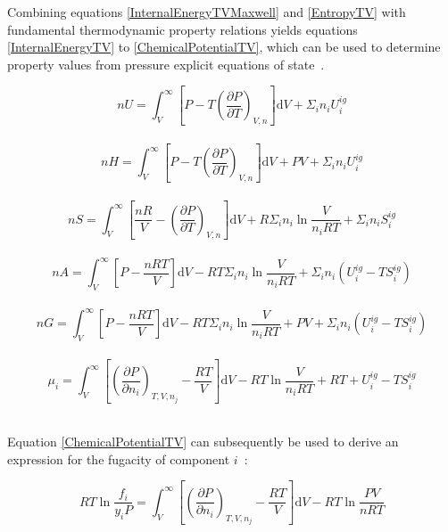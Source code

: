 
Combining equations \ref{InternalEnergyTVMaxwell} and \ref{EntropyTV} with fundamental thermodynamic property relations yields equations \ref{InternalEnergyTV} to \ref{ChemicalPotentialTV}, which can be used to determine property values from pressure explicit equations of state~\cite{MolecularThermodynamicsOfFluidPhaseEquilibria,ThermophysicalProperties}.\

\begin{equation}
nU = \int_{V}^{\infty} \left[ P - T\left(\frac{\partial P }{\partial T}\right)_{V, n} \right]\mathrm{d}V + \Sigma_{i} n_{i}U_{i}^{ig} \label{InternalEnergyTV}
\end{equation}\
\begin{equation}
nH = \int_{V}^{\infty} \left[ P - T\left(\frac{\partial P }{\partial T}\right)_{V, n} \right]\mathrm{d}V + PV +\Sigma_{i} n_{i}U_{i}^{ig}
\end{equation}\
\begin{equation}
nS = \int_{V}^{\infty} \left[ \frac{nR}{V} -\left(\frac{\partial P }{\partial T}\right)_{V, n} \right]\mathrm{d}V + R\Sigma_{i} n_{i} \ln \frac{V}{n_{i}RT}+ \Sigma_{i} n_{i}S_{i}^{ig}
\end{equation}\
\begin{equation}
nA = \int_{V}^{\infty} \left[P -\frac{nRT }{V}\right]\mathrm{d}V - RT\Sigma_{i} n_{i} \ln \frac{V}{n_{i}RT}+ \Sigma_{i} n_{i}\left(U_{i}^{ig} -TS_{i}^{ig}\right) \label{HelmholtzFromEOS}
\end{equation}\
\begin{equation}
nG = \int_{V}^{\infty} \left[P -\frac{nRT }{V}\right]\mathrm{d}V - RT\Sigma_{i} n_{i} \ln \frac{V}{n_{i}RT}+ PV + \Sigma_{i} n_{i}\left(U_{i}^{ig} -TS_{i}^{ig}\right)
\end{equation}\
\begin{equation}
\mu_{i} = \int_{V}^{\infty} \left[\left(\frac{\partial P }{\partial n_{i}}\right)_{T,V, n_{j}} -\frac{RT }{V}\right]\mathrm{d}V - RT \ln \frac{V}{n_{i}RT}+ RT + U_{i}^{ig} -TS_{i}^{ig} \label{ChemicalPotentialTV}
\end{equation}\

Equation \ref{ChemicalPotentialTV} can subsequently be used to derive an expression for the fugacity of component $i$~\cite{MolecularThermodynamicsOfFluidPhaseEquilibria,ThermophysicalProperties}:\

\begin{equation}
RT \ln \frac{f_{i}}{y_{i}P} = \int_{V}^{\infty} \left[\left(\frac{\partial P }{\partial n_{i}}\right)_{T,V, n_{j}} -\frac{RT}{V}\right]\mathrm{d}V - RT \ln \frac{PV}{nRT}
\end{equation}\

